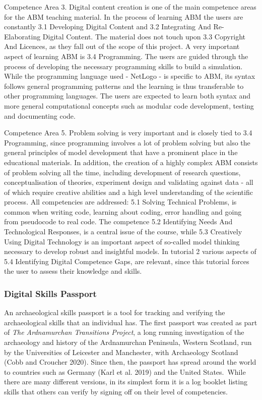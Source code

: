\documentclass[
]{article}
\begin{document}
Competence Area 3. Digital content creation is one of the main competence areas for the ABM teaching material. In the process of learning ABM the users are constantly 3.1 Developing Digital Content and 3.2 Integrating And Re-Elaborating Digital Content. The material does not touch upon 3.3 Copyright And Licences, as they fall out of the scope of this project. A very important aspect of learning ABM is 3.4 Programming. The users are guided through the process of developing the necessary programming skills to build a simulation. While the programming language used - NetLogo - is specific to ABM, its syntax follows general programming patterns and the learning is thus transferable to other programming languages. The users are expected to learn both syntax and more general computational concepts such as modular code development, testing and documenting code.

Competence Area 5. Problem solving is very important and is closely tied to 3.4 Programming, since programming involves a lot of problem solving but also the general principles of model development that have a prominent place in the educational materials. In addition, the creation of a highly complex ABM consists of problem solving all the time, including development of research questions, conceptualisation of theories, experiment design and validating against data - all of which require creative abilities and a high level understanding of the scientific process. All competencies are addressed: 5.1 Solving Technical Problems, is common when writing code, learning about coding, error handling and going from pseudocode to real code. The competence 5.2 Identifying Needs And Technological Responses, is a central issue of the course, while 5.3 Creatively Using Digital Technology is an important aspect of so-called model thinking necessary to develop robust and insightful models. In tutorial 2 various aspects of 5.4 Identifying Digital Competence Gaps, are relevant, since this tutorial forces the user to assess their knowledge and skills.

\hypertarget{digital-skills-passport}{%
\subsubsection{Digital Skills Passport}\label{digital-skills-passport}}

An archaeological skills passport is a tool for tracking and verifying the archaeological skills that an individual has. The first passport was created as part of \emph{The Ardnamurchan Transitions Project}, a long running investigation of the archaeology and history of the Ardnamurchan Peninsula, Western Scotland, run by the Universities of Leicester and Manchester, with Archaeology Scotland (Cobb and Croucher 2020). Since then, the passport has spread around the world to countries such as Germany (Karl et al. 2019) and the United States.~While there are many different versions, in its simplest form it is a log booklet listing skills that others can verify by signing off on their level of competencies.~
\end{document}
